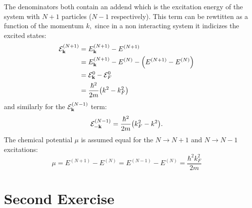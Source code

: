 \documentclass[a4paper]{article}
\begin{document}
The denominators both contain an addend which is the excitation energy of the system with $N+1$ particles ($N-1$ respectively).
This term can be rewtitten as a function of the momentum $k,$ since in a non interacting system it indicizes the excited states:
\begin{align}
\mathcal{E}_{\vb{k}}^{(N+1)} &= E_{\vb{k}}^{(N+1)} - E^{(N+1)}\\
&= E^{(N+1)}_{\vb{k}} - E^{(N)} - \pqty{E^{(N+1)} - E^{(N)}}\\
&= \mathcal{E}_{\vb{k}}^0 - \mathcal{E}_{F}^0\\
&= \frac{\hbar^2}{2m} \pqty{k^2 - k_F^2}
\end{align}
and similarly for the $\mathcal{E}_{\vb{k}}^{(N-1)}$ term:
\begin{equation}
\mathcal{E}_{-\vb{k}}^{(N-1)} =  \frac{\hbar^2}{2m} \pqty{k_F^2 - k^2}.
\end{equation}
The chemical potential $\mu$ is assumed equal for the $N \rightarrow N+1$ and $N \rightarrow N-1$ excitations:
\begin{equation}
\mu = E^{(N+1)} - E^{(N)}=E^{(N-1)} - E^{(N)} =\frac{\hbar^2k_F^2}{2m}
\end{equation}




\newpage
\section{Second Exercise}
\end{document}
